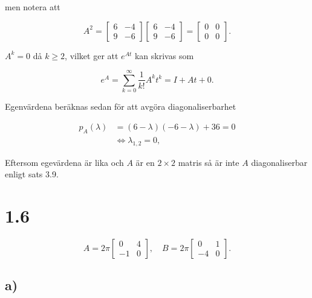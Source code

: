 \documentclass[a4paper]{article}
\newcommand{\mat}[1]{\bm{\mathit{#1}}}
\begin{document}
\noindent men notera att 

\begin{equation*}
	\mat{A}^2 = \begin{bmatrix} 6 & -4\\9 & -6\end{bmatrix}\begin{bmatrix} 6 & -4\\9 & -6\end{bmatrix} = \begin{bmatrix} 0 & 0\\0 & 0\end{bmatrix}.
\end{equation*}

\noindent $\mat{A}^k = 0$ då $k \geq 2$, vilket ger att $e^{\mat{A}t}$ kan skrivas som

\begin{equation*}
	e^{\mat{A}} = \sum_{k=0}^{\infty}\frac{1}{k!}\mat{A}^kt^k = \mat{I} + \mat{A}t + 0.
\end{equation*}

\noindent Egenvärdena beräknas sedan för att avgöra diagonaliserbarhet

\begin{align*}
	p_A(\lambda) &= (6-\lambda)(-6-\lambda) + 36 = 0\\
				&\iff \lambda_{1,2} = 0,
\end{align*}

\noindent Eftersom egevärdena är lika och $\mat{A}$ är en $2\times 2$ matris så är inte $\mat{A}$ diagonaliserbar enligt sats 3.9.


\section*{1.6}

\begin{equation*}
  \mat{A} = 2\pi\begin{bmatrix}0 & 4\\-1 & 0\end{bmatrix},\quad \mat{B} = 2\pi\begin{bmatrix}0 & 1\\-4 & 0\end{bmatrix}.
\end{equation*}

\subsection*{a)}
\end{document}
